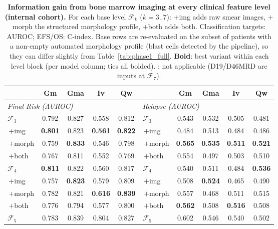 \documentclass[pdflatex,sn-nature]{sn-jnl}
\begin{document}
\begin{table}[p]
\caption{\textbf{Information gain from bone marrow imaging at every
clinical feature level (internal cohort).} For each base level
$\mathcal{F}_k$ ($k=3..7$): $+$img adds raw smear images, $+$morph the
structured morphology profile, $+$both adds both. Classification
targets: AUROC; EFS/OS: C-index. Base rows are re-evaluated on the
subset of patients with a non-empty automated morphology profile
(blast cells detected by the pipeline), so they can differ slightly
from Table~\ref{tab:phase1_full}. \textbf{Bold}: best variant within
each level block (per model column; ties all bolded). \textemdash: not
applicable (D19/D46MRD are inputs at $\mathcal{F}_7$).}
\label{tab:imgmorph_int}
\centering
\tiny
\renewcommand{\arraystretch}{0.5}
\setlength{\tabcolsep}{3.5pt}
\begin{tabular}{@{}l cccc @{\hskip 1.2em} l cccc@{}}
\toprule
 & Gm & Gma & Iv & Qw & & Gm & Gma & Iv & Qw \\
\midrule
\multicolumn{5}{l}{\textit{Final Risk (AUROC)}} & \multicolumn{5}{l}{\textit{Relapse (AUROC)}} \\
$\mathcal{F}_3$      & 0.792 & 0.827 & 0.558 & 0.812 & $\mathcal{F}_3$      & 0.543 & 0.532 & 0.505 & 0.481 \\
\;\,$+$img           & \textbf{0.801} & 0.823 & \textbf{0.561} & \textbf{0.822} & \;\,$+$img           & 0.484 & 0.513 & 0.484 & 0.486 \\
\;\,$+$morph         & 0.759 & \textbf{0.833} & 0.546 & 0.798 & \;\,$+$morph         & \textbf{0.565} & \textbf{0.535} & \textbf{0.511} & \textbf{0.521} \\
\;\,$+$both          & 0.767 & 0.811 & 0.552 & 0.769 & \;\,$+$both          & 0.554 & 0.497 & 0.503 & 0.510 \\
\addlinespace[2pt]
$\mathcal{F}_4$      & \textbf{0.811} & 0.822 & 0.560 & 0.817 & $\mathcal{F}_4$      & 0.540 & 0.511 & 0.484 & \textbf{0.536} \\
\;\,$+$img           & 0.757 & \textbf{0.823} & 0.579 & 0.809 & \;\,$+$img           & 0.508 & \textbf{0.524} & 0.465 & 0.490 \\
\;\,$+$morph         & 0.782 & 0.821 & \textbf{0.616} & \textbf{0.839} & \;\,$+$morph         & 0.557 & 0.468 & 0.511 & 0.515 \\
\;\,$+$both          & 0.776 & 0.794 & 0.577 & 0.800 & \;\,$+$both          & \textbf{0.562} & 0.508 & \textbf{0.516} & 0.508 \\
\addlinespace[2pt]
$\mathcal{F}_5$      & 0.783 & 0.839 & 0.804 & 0.827 & $\mathcal{F}_5$      & 0.602 & 0.546 & 0.540 & 0.502 \\

\end{tabular}
\end{table}
\end{document}
